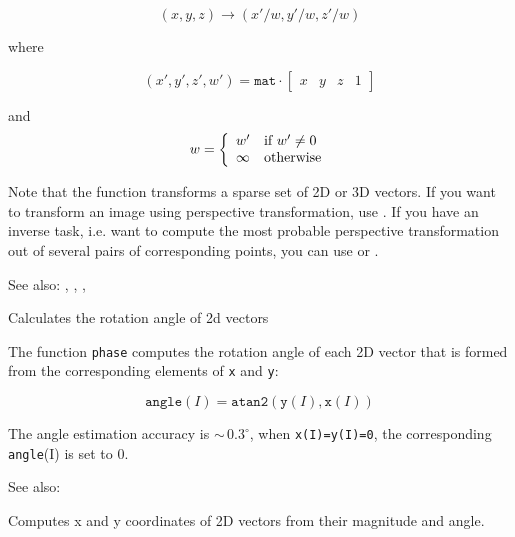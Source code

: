 \[ (x, y, z) \rightarrow (x'/w, y'/w, z'/w) \]

where

\[
(x', y', z', w') = \texttt{mat} \cdot
\begin{bmatrix} x & y & z & 1 \end{bmatrix}
\]

and
\[ w = \left\{ \begin{array}{l l} w' & \mbox{if $w' \ne 0$}\\ \infty & \mbox{otherwise}\\ \end{array} \right. \]

Note that the function transforms a sparse set of 2D or 3D vectors. If you want to transform an image using perspective transformation, use . If you have an inverse task, i.e. want to compute the most probable perspective transformation out of several pairs of corresponding points, you can use  or .

See also: , , , 

Calculates the rotation angle of 2d vectors

\begin{description}
\end{description}

The function \texttt{phase} computes the rotation angle of each 2D vector that is formed from the corresponding elements of \texttt{x} and \texttt{y}:

\[\texttt{angle}(I) = \texttt{atan2}(\texttt{y}(I), \texttt{x}(I))\]

The angle estimation accuracy is $\sim\,0.3^\circ$, when \texttt{x(I)=y(I)=0}, the corresponding \texttt{angle}(I) is set to $0$.

See also:

Computes x and y coordinates of 2D vectors from their magnitude and angle.

